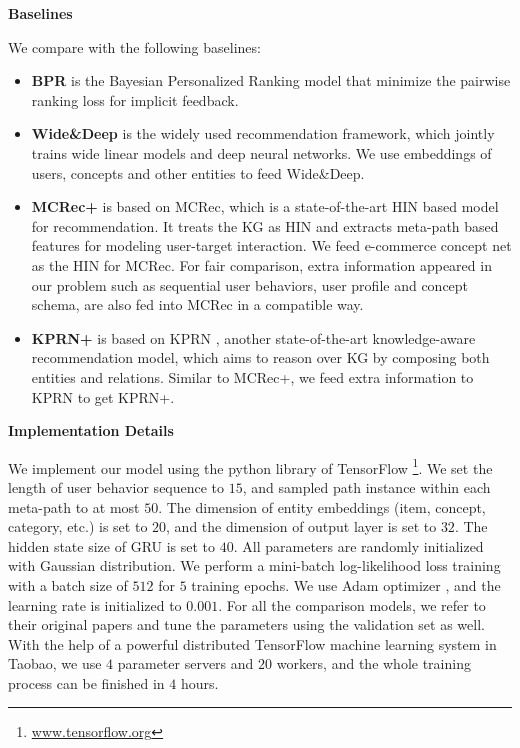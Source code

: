 \noindent
\textbf{Baselines}

\noindent
We compare with the following baselines:
\begin{itemize}
	\itemsep0em
	\item \textbf{BPR} \cite{rendle2009bpr} is the Bayesian Personalized Ranking model that minimize the pairwise ranking loss for implicit feedback.
	\item \textbf{Wide\&Deep} \cite{cheng2016wide} is the widely used recommendation framework, which jointly trains wide linear models and deep neural networks. We use embeddings of users, concepts and other entities to feed Wide\&Deep.
	\item \textbf{MCRec+} is based on MCRec\cite{hu2018leveraging}, which is a state-of-the-art HIN based model for recommendation. It treats the KG as HIN and extracts meta-path based features for modeling user-target interaction. 
	We feed e-commerce concept net as the HIN for MCRec. For fair comparison, extra information appeared in our problem such as sequential user behaviors, user profile and concept schema, 
	are also fed into MCRec in a compatible way.
	\item \textbf{KPRN+} is based on KPRN \cite{wang2018explainable}, another state-of-the-art knowledge-aware recommendation model, which aims to reason over KG by composing both entities and relations. Similar to MCRec+, we feed extra information to KPRN to get KPRN+.
\end{itemize}

\noindent
\textbf{Implementation Details}

\noindent
We implement our model using the python library of TensorFlow \footnote{\url{www.tensorflow.org}}. 
We set the length of user behavior sequence to $15$,
and sampled path instance within each meta-path to at most $50$.
The dimension of entity embeddings (item, concept, category, etc.) is set to $20$, 
and the dimension of output layer is set to $32$.
The hidden state size of GRU is set to $40$.
All parameters are randomly initialized with Gaussian distribution.
We perform a mini-batch log-likelihood loss training with a batch size of $512$ for $5$ training epochs.
We use Adam optimizer \cite{kingma2014adam}, and the learning rate is initialized to $0.001$.
For all the comparison models, 
we refer to their original papers and tune the parameters using the validation set as well.
With the help of a powerful distributed TensorFlow machine learning system in Taobao, 
we use $4$ parameter servers and $20$ workers,
and the whole training process can be finished in $4$ hours.

